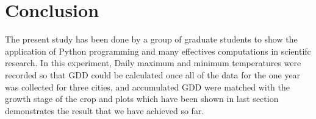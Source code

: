 \documentclass[DIV=calc, paper=a4, fontsize=11pt, twocolumn]{scrartcl}
\begin{document}
\section{Conclusion}
The present study has been done by a group of graduate students to show the application of Python programming and many effectives computations in scientifc research. In this experiment, Daily maximum and minimum temperatures were recorded so that GDD could be calculated once all of the data for the one year was collected for three cities, and accumulated GDD were matched with the growth stage of the crop and plots which have been shown in last section demonstrates the result that we have achieved so far.

\end{document}
